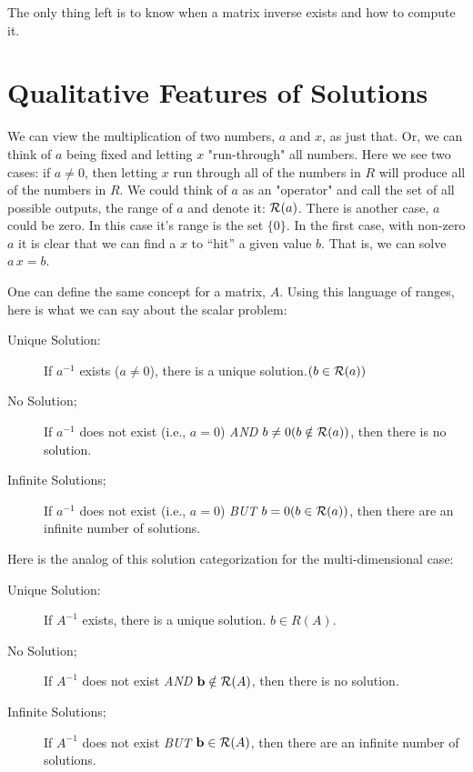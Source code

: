 \documentclass{article}
\begin{document}
The only thing left is to know when a matrix inverse exists and how to compute it.


\section{Qualitative Features of Solutions}
We can view the multiplication of two numbers, $a$ and $x$, as just that.
Or, we can think of $a$ being fixed and letting $x$ "run-through" all 
numbers. Here we see two cases: if $a \neq 0$, then letting $x$ run
through all of the numbers in $R$ will produce all of the numbers in $R$.
We could think of $a$ as an "operator" and call the set of all possible 
outputs, the range of $a$ and denote it: ${\cal R}(a)$.
There is another case, $a$ could be zero. In this case it's range is the
set $\{0\}$. In the first case, with non-zero $a$ it is clear that we can
find a $x$ to ``hit'' a given value $b$. That is, we can solve $a\, x = b$.

One can define the same concept for a matrix, $A$. Using this language
of ranges, here is what we can say about the scalar problem:
\begin{description}
    \item[Unique Solution:]{If $a^{-1}$ exists ($a \neq 0$), there is
    a unique solution.$(b \in {\cal R}(a))$}
\item[No Solution;]{If $a^{-1}$ does not exist (i.e., $a = 0$) {\em AND\/}
    $b \ne 0(b \notin {\cal R}(a))$, then there is no solution.}
\item[Infinite Solutions;]{If $a^{-1}$ does not exist (i.e., $a = 0$) {\em BUT\/}
    $b = 0(b \in {\cal R}(a))$, then there are an infinite number of solutions.}
\end{description}

Here is the analog of this solution categorization for the multi-dimensional case:
\begin{description}
\item[Unique Solution:]{If $A^{-1}$ exists, there is
    a unique solution. $b \in R(A)$.}
\item[No Solution;]{If $A^{-1}$ does not exist {\em AND\/}
    ${\bf b} \notin {\cal R}(A)$,
    then there is no solution.}  
\item[Infinite Solutions;]{If $A^{-1}$ does not exist {\em BUT\/}
    ${\bf b} \in {\cal R}(A)$,
    then there are an infinite number of solutions.}  
\end{description}
\end{document}
